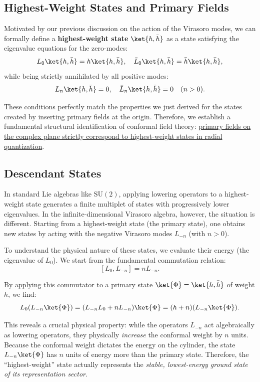 \subsection{Highest-Weight States and Primary Fields}

Motivated by our previous discussion on the action of the Virasoro modes, we can formally define a \textbf{highest-weight state} \(\ket{h, \bar{h}}\) as a state satisfying the eigenvalue equations for the zero-modes:
\[
    L_0 \ket{h, \bar{h}} = h \ket{h, \bar{h}}, \quad \bar{L}_0 \ket{h, \bar{h}} = \bar{h} \ket{h, \bar{h}},
\]
while being strictly annihilated by all positive modes:
\[
    L_n \ket{h, \bar{h}} = 0, \quad \bar{L}_n \ket{h, \bar{h}} = 0 \quad (n > 0).
\]

These conditions perfectly match the properties we just derived for the states created by inserting primary fields at the origin. Therefore, we establish a fundamental structural identification of conformal field theory: \uline{primary fields on the complex plane strictly correspond to highest-weight states in radial quantization}.

\subsection{Descendant States}

In standard Lie algebras like \(\mathrm{SU}(2)\), applying lowering operators to a highest-weight state generates a finite multiplet of states with progressively lower eigenvalues. In the infinite-dimensional Virasoro algebra, however, the situation is different. Starting from a highest-weight state (the primary state), one obtains new states by acting with the negative Virasoro modes \(L_{-n}\) (with \(n > 0\)).

To understand the physical nature of these states, we evaluate their energy (the eigenvalue of \(L_0\)). We start from the fundamental commutation relation:
\[
    [L_0, L_{-n}] = n L_{-n}.
\]

By applying this commutator to a primary state \(\ket{\Phi} = \ket{h, \bar{h}}\) of weight \(h\), we find:
\[
    L_0 (L_{-n} \ket{\Phi}) = (L_{-n} L_0 + n L_{-n}) \ket{\Phi} = (h + n) (L_{-n} \ket{\Phi}).
\]

This reveals a crucial physical property: while the operators \(L_{-n}\) act algebraically as lowering operators, they physically \textit{increase} the conformal weight by \(n\) units. Because the conformal weight dictates the energy on the cylinder, the state \(L_{-n}\ket{\Phi}\) has \(n\) units of energy more than the primary state. Therefore, the ``highest-weight'' state actually represents the \textit{stable, lowest-energy ground state of its representation sector}.

